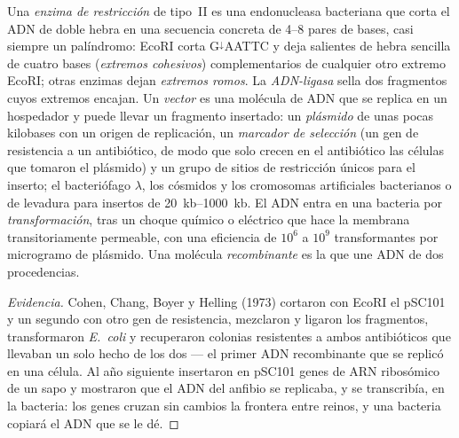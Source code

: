 \begin{definition}\label{def:b3:genetic-engineering:tools}
Una \emph{enzima de restricción} de tipo~II es una endonucleasa
bacteriana que corta el ADN de doble hebra en una secuencia concreta de
\numrange{4}{8} pares de bases, casi siempre un palíndromo: EcoRI corta
G$^{\downarrow}$AATTC y deja salientes de hebra sencilla de cuatro bases
(\emph{extremos cohesivos}) complementarios de cualquier otro extremo
EcoRI; otras enzimas dejan \emph{extremos romos}. La \emph{ADN-ligasa}
sella dos fragmentos cuyos extremos encajan. Un \emph{vector} es una
molécula de ADN que se replica en un hospedador y puede llevar un
fragmento insertado: un \emph{plásmido} de unas pocas kilobases con un
origen de replicación, un \emph{marcador de selección} (un gen de
resistencia a un antibiótico, de modo que solo crecen en el antibiótico
las células que tomaron el plásmido) y un grupo de sitios de restricción
únicos para el inserto; el bacteriófago $\lambda$, los cósmidos y los
cromosomas artificiales bacterianos o de levadura para insertos de
\qtyrange{20}{1000}{kb}. El ADN entra en una bacteria por
\emph{transformación}, tras un choque químico o eléctrico que hace la
membrana transitoriamente permeable, con una eficiencia de $10^{6}$ a
$10^{9}$ transformantes por microgramo de plásmido. Una molécula
\emph{recombinante} es la que une ADN de dos procedencias.
\end{definition}

\begin{proof}[Evidencia]
Cohen, Chang, Boyer y Helling (1973) cortaron con EcoRI el 
pSC101 y un segundo  con otro gen de resistencia, mezclaron y
ligaron los fragmentos, transformaron \emph{E.~coli} y recuperaron
colonias resistentes a ambos antibióticos que llevaban un solo 
hecho de los dos --- el primer ADN recombinante que se replicó en una
célula. Al año siguiente insertaron en pSC101 genes de ARN ribosómico de
un sapo y mostraron que el ADN del anfibio se replicaba, y se
transcribía, en la bacteria: los genes cruzan sin cambios la frontera
entre reinos, y una bacteria copiará el ADN que se le dé.
\end{proof}


